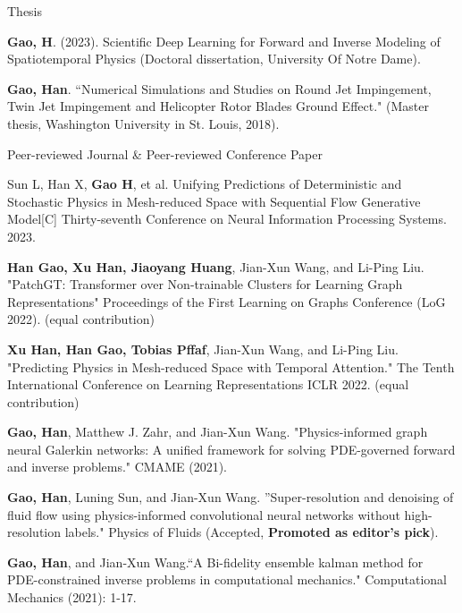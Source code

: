 \documentclass{resume} %
\begin{document}
\begin{rSection}{Thesis}
\item \textbf{Gao, H}. (2023). Scientific Deep Learning for Forward and Inverse Modeling of Spatiotemporal Physics (Doctoral dissertation, University Of Notre Dame).	
\item \textbf{Gao, Han}. ``Numerical Simulations and Studies on Round Jet Impingement, Twin Jet Impingement and Helicopter Rotor Blades Ground Effect." (Master thesis,  Washington University in St. Louis, 2018).
\end{rSection}

\begin{rSection}{Peer-reviewed Journal \& Peer-reviewed Conference Paper}
\item Sun L, Han X, \textbf{Gao H}, et al. Unifying Predictions of Deterministic and Stochastic Physics in Mesh-reduced Space with Sequential Flow Generative Model[C] Thirty-seventh Conference on Neural Information Processing Systems. 2023.	
\item \textbf{Han Gao, Xu Han, Jiaoyang Huang}, Jian-Xun Wang, and Li-Ping Liu. "PatchGT: Transformer over Non-trainable Clusters for Learning Graph Representations" Proceedings of the First Learning on Graphs Conference (LoG 2022). (equal contribution)
\item \textbf{Xu Han, Han Gao, Tobias Pffaf}, Jian-Xun Wang, and Li-Ping Liu. "Predicting Physics in Mesh-reduced Space with Temporal Attention." The Tenth International Conference on Learning Representations ICLR 2022. (equal contribution)

\item \textbf{Gao, Han}, Matthew J. Zahr, and Jian-Xun Wang. "Physics-informed graph neural Galerkin networks: A unified framework for solving PDE-governed forward and inverse problems." CMAME (2021).


\item \textbf{Gao, Han}, Luning Sun, and Jian-Xun Wang. ''Super-resolution and denoising of fluid flow using physics-informed convolutional neural networks without high-resolution labels." Physics of Fluids (Accepted, \textbf{Promoted as editor's pick}).

\item \textbf{Gao, Han}, and Jian-Xun Wang.``A Bi-fidelity ensemble kalman method for PDE-constrained inverse problems in computational mechanics." Computational Mechanics (2021): 1-17.\\


\end{rSection}
\end{document}
